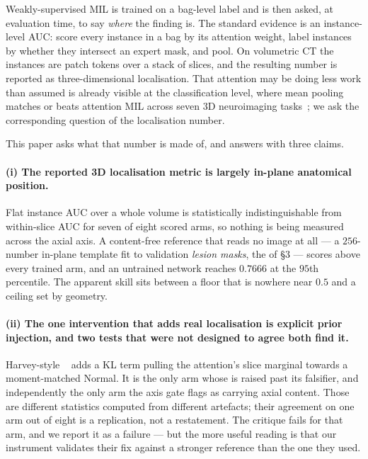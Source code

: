 \documentclass[10pt]{article}
\begin{document}
Weakly-supervised MIL is trained on a bag-level label and is then asked, at
evaluation time, to say \emph{where} the finding is. The standard evidence is an
instance-level AUC: score every instance in a bag by its attention weight, label
instances by whether they intersect an expert mask, and pool. On volumetric CT
the instances are patch tokens over a stack of slices, and the resulting number
is reported as three-dimensional localisation. That attention may be doing less
work than assumed is already visible at the classification level, where mean
pooling matches or beats attention MIL across seven 3D neuroimaging
tasks~\citep{harvey2026benchmark}; we ask the corresponding question of the
localisation number.

This paper asks what that number is made of, and answers with three claims.

\paragraph{(i) The reported 3D localisation metric is largely in-plane
anatomical position.} Flat instance AUC over a whole volume is statistically
indistinguishable from within-slice AUC for seven of eight scored arms, so
nothing is being measured across the axial axis. A content-free reference that
reads no image at all --- a $256$-number in-plane template fit to validation
\emph{lesion masks}, the \maskref{} of \S3 --- scores above every trained arm,
and an untrained network reaches $0.7666$ at the $95$th percentile. The apparent skill sits between a floor that is nowhere near
$0.5$ and a ceiling set by geometry.

\paragraph{(ii) The one intervention that adds real localisation is explicit
prior injection, and two tests that were not designed to agree both find it.}
Harvey-style \armNG{}~\citep{harvey2026normal} adds a KL term pulling the attention's
slice marginal towards a moment-matched Normal. It is the only arm whose
\pss{} is raised past its falsifier, and independently the only arm the axis
gate flags as carrying axial content. Those are different statistics computed
from different artefacts; their agreement on one arm out of eight is a
replication, not a restatement. The critique fails for that arm, and we report
it as a failure --- but the more useful reading is that our instrument validates
their fix against a stronger reference than the one they used.
\end{document}
